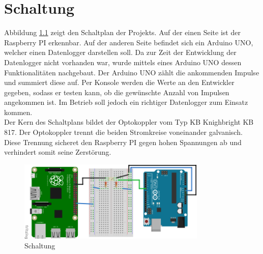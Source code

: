 \chapter{Schaltung}
Abbildung \ref{schaltung} zeigt den Schaltplan der Projekts. Auf der einen Seite ist der Raspberry PI erkennbar. Auf der anderen Seite befindet sich ein Arduino UNO, welcher einen Datenlogger darstellen soll. Da zur Zeit der Entwicklung der Datenlogger nicht vorhanden war, wurde mittels eines Arduino UNO dessen Funktionalitäten nachgebaut. Der Arduino UNO zählt die ankommenden Impulse und summiert diese auf. Per Konsole werden die Werte an den Entwickler gegeben, sodass er testen kann, ob die gewünschte Anzahl von Impulsen angekommen ist. Im Betrieb soll jedoch ein richtiger Datenlogger zum Einsatz kommen.\\
Der Kern des Schaltplans bildet der Optokoppler vom Typ KB Knighbright KB 817. Der Optokoppler trennt die beiden Stromkreise voneinander galvanisch. Diese Trennung sicheret den Raspberry PI gegen hohen Spannungen ab und verhindert somit seine Zerstörung. 
\begin{figure}[H]
 	\centering
 	\includegraphics[width=0.8\textwidth]{bilder/schaltung.png}
 	\caption{Schaltung}
	\label{schaltung}
\end{figure}
